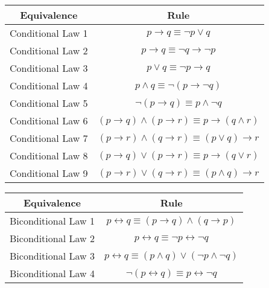\documentclass{exam}
\begin{document}
\vspace{5mm}
\begin{center}
\begin{tabular}{|c|c|}
  \hline
  Equivalence & Rule \\
  \hline
  Conditional Law 1 & $p \rightarrow q \equiv \lnot p \lor q$ \\
  Conditional Law 2 & $p \rightarrow q \equiv \lnot q \rightarrow \lnot p$ \\
  Conditional Law 3 & $p \lor q \equiv \lnot p \rightarrow q$ \\
  Conditional Law 4 & $p \land q \equiv \lnot (p \rightarrow \lnot q)$ \\
  Conditional Law 5 & $\lnot (p \rightarrow q) \equiv p \land \lnot q$ \\
  Conditional Law 6 & $(p \rightarrow q) \land (p \rightarrow r) \equiv p \rightarrow (q \land r)$ \\
  Conditional Law 7 & $(p \rightarrow r) \land (q \rightarrow r) \equiv (p \lor q) \rightarrow r$ \\
  Conditional Law 8 & $(p \rightarrow q) \lor (p \rightarrow r) \equiv p \rightarrow (q \lor r)$ \\
  Conditional Law 9 & $(p \rightarrow r) \lor (q \rightarrow r) \equiv (p \land q) \rightarrow r$ \\
  \hline
\end{tabular}
\end{center}
\vspace{5mm}
\begin{center}
    \begin{tabular}{|c|c|}
  \hline
  Equivalence & Rule \\
  \hline
  Biconditional Law 1 & $p \leftrightarrow q \equiv (p \rightarrow q) \land (q \rightarrow p)$ \\
  Biconditional Law 2 & $p \leftrightarrow q \equiv \lnot p \leftrightarrow \lnot q$ \\
  Biconditional Law 3 & $p \leftrightarrow q \equiv (p \land q) \lor (\lnot p \land \lnot q)$ \\
  Biconditional Law 4 & $\lnot (p \leftrightarrow q) \equiv p \leftrightarrow \lnot q$ \\
  \hline
\end{tabular}

\end{center}
\end{document}
